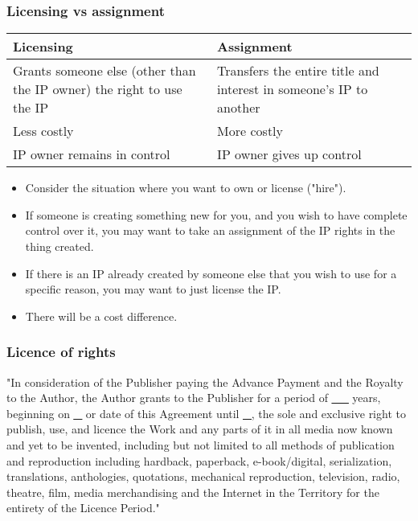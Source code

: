 \documentclass[11pt]{article}
\begin{document}
\subsubsection{Licensing vs assignment}
\label{sec:orge3ee3f3}
\begin{center}
\begin{tabular}{m{16em}|m{16em}}
Licensing & Assignment\\[0pt]
\hline
Grants someone else (other than the IP owner) the right to use the IP & Transfers the entire title and interest in someone's IP to another\\[0pt]
\hline
Less costly & More costly\\[0pt]
\hline
IP owner remains in control & IP owner gives up control\\[0pt]
\end{tabular}
\end{center}

\begin{itemize}
\item Consider the situation where you want to own or license ("hire").
\item If someone is creating something new for you, and you wish to have complete control over it, you may want to take an assignment of the IP rights in the thing created.
\item If there is an IP already created by someone else that you wish to use for a specific reason, you may want to just license the IP.
\item There will be a cost difference.
\end{itemize}

\subsubsection{Licence of rights}
\label{sec:org151eeda}
"In consideration of the Publisher paying the Advance Payment and the Royalty to the Author, the Author grants to the Publisher for a period of \uline{\uline{\_\_}} years, beginning on \uline{\uline{\uline{\_}}} or date of this Agreement until \uline{\uline{\uline{\uline{\_}}}}, the sole and exclusive right to publish, use, and licence the Work and any parts of it in all media now known and yet to be invented, including but not limited to all methods of publication and reproduction including hardback, paperback, e-book/digital, serialization, translations, anthologies, quotations, mechanical reproduction, television, radio, theatre, film, media merchandising and the Internet in the Territory for the entirety of the Licence Period."
\end{document}
